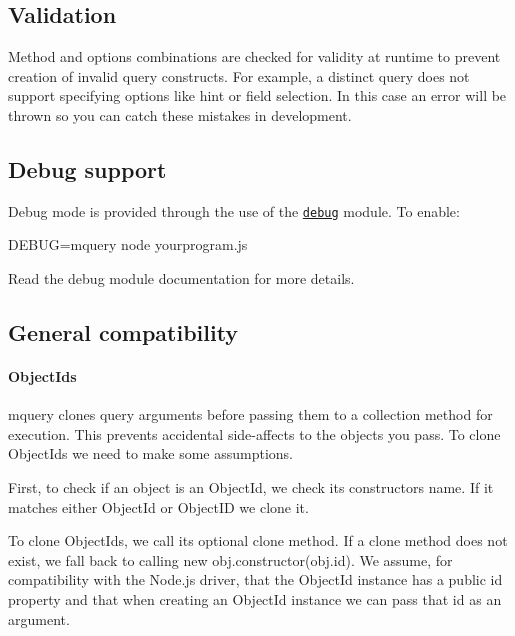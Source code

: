 \subsection*{Validation}

Method and options combinations are checked for validity at runtime to prevent creation of invalid query constructs. For example, a {\ttfamily distinct} query does not support specifying options like {\ttfamily hint} or field selection. In this case an error will be thrown so you can catch these mistakes in development.

\subsection*{Debug support}

Debug mode is provided through the use of the \href{https://github.com/visionmedia/debug}{\tt debug} module. To enable\+: \begin{DoxyVerb}DEBUG=mquery node yourprogram.js
\end{DoxyVerb}


Read the debug module documentation for more details.

\subsection*{General compatibility}

\paragraph*{Object\+Ids}

{\ttfamily mquery} clones query arguments before passing them to a {\ttfamily collection} method for execution. This prevents accidental side-\/affects to the objects you pass. To clone {\ttfamily Object\+Ids} we need to make some assumptions.

First, to check if an object is an {\ttfamily Object\+Id}, we check its constructors name. If it matches either {\ttfamily Object\+Id} or {\ttfamily Object\+ID} we clone it.

To clone {\ttfamily Object\+Ids}, we call its optional {\ttfamily clone} method. If a {\ttfamily clone} method does not exist, we fall back to calling {\ttfamily new obj.\+constructor(obj.\+id)}. We assume, for compatibility with the Node.\+js driver, that the {\ttfamily Object\+Id} instance has a public {\ttfamily id} property and that when creating an {\ttfamily Object\+Id} instance we can pass that {\ttfamily id} as an argument.

